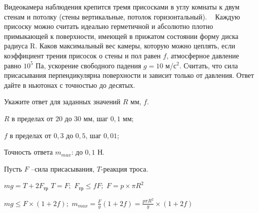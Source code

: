 Видеокамера наблюдения крепится тремя присосками в углу
комнаты к двум стенам и потолку (стены вертикальные, потолок горизонтальный).   Каждую
присоску можно считать идеально герметичной и абсолютно плотно примыкающей к поверхности,
имеющей в прижатом состоянии форму диска радиуса R. Каков
максимальный вес камеры, которую можно цеплять, если коэффициент трения
присосок о стены и пол равен $f$, атмосферное
давление равно $10^5$ Па, ускорение свободного падения $g = 10$ м/с$^2$. Считать, что
сила присасывания перпендикулярна поверхности и зависит только от давления. Ответ дайте в ньютонах с точностью до десятых.

Укажите ответ для заданных значений $R$ мм, $f$.

\paramSection

$R$  в пределах от $20$ до $30$ мм, шаг $0,1$ мм;

$f$ в пределах от $0,3$ до $0,5$, шаг $0,01$;

Точность ответа $m_{max}$: до $0,1$ Н.

\solutionSection

Пусть $F$ –сила присасывания, $T$-реакция троса.

$mg=T+2F_{\text{тр}}$     $T=F;$     $ F_{\text{тр}} \leq fF;$   $F=p \times \pi R^2$  

$mg \leq F \times (1+2f);$     $m_{max}=\frac{F}{g}(1+2f)=\frac{p\pi R^2}{g} \times (1+2f)$

